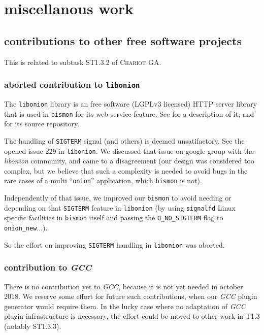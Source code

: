 \section{miscellanous work}
\label{sec:miscwork}

\subsection{contributions to other free software projects}

\label{subsec:contribfree}
This is related to subtask ST1.3.2 of \textsc{Chariot} GA.

\subsubsection{aborted contribution to \texttt{libonion}}
\label{subsubsec:contriblibonion}
The \texttt{libonion} library is an free software (LGPLv3 licensed)
HTTP server library that is used in \texttt{bismon} for its web
service feature. See  for a
description of it, and 
for its source repository.

The handling of \texttt{SIGTERM} signal (and others) is deemed
unsatifactory. See the opened issue 229 {} in
\texttt{libonion}.  We discussed that issue on google group with the
\emph{libonion} community, and came to a disagreement (our design was
considered too complex, but we believe that such a complexity is
needed to avoid bugs in the rare cases of a multi ``\texttt{onion}''
application, which \texttt{bismon} is not).

Independently of that issue, we improved our \texttt{bismon} to avoid
needing or depending on that \texttt{SIGTERM} feature in
\texttt{libonion} (by using \texttt{signalfd} Linux specific
facilities in \texttt{bismon} itself and passing the
\texttt{O\_NO\_SIGTERM} flag to \texttt{onion\_new}...).

So the effort on improving \texttt{SIGTERM} handling in
\texttt{libonion} was aborted.

\subsubsection{contribution to \emph{GCC}}
\label{subsubsec:contribgcc}
There is no contribution yet to \emph{GCC}, because it is not yet
needed in october 2018. We reserve some effort for future such
contributions, when our \emph{GCC} plugin generator would require
them. In the lucky case where no adaptation of \emph{GCC} plugin
infrastructure is necessary, the effort could be moved to other work
in T1.3 (notably ST1.3.3).
